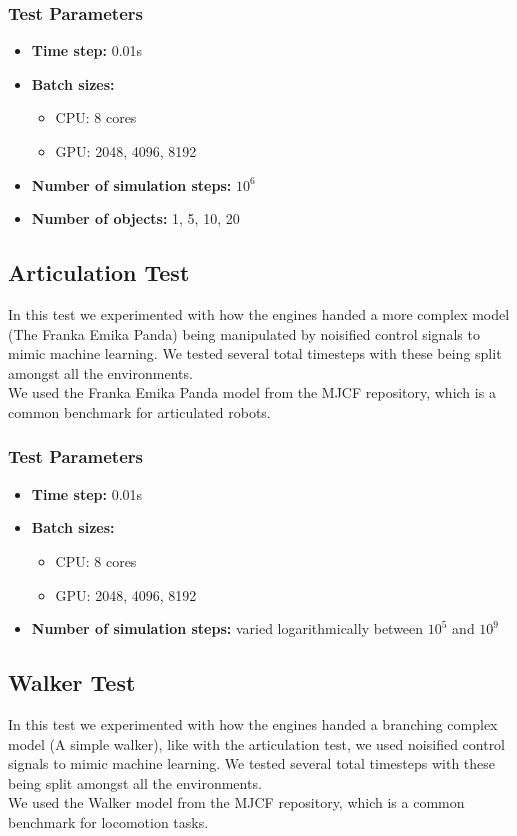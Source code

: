 \documentclass[11pt,a4paper]{article}
\begin{document}
\subsubsection{Test Parameters}
\begin{itemize}
    \item \textbf{Time step:} 0.01s
    \item \textbf{Batch sizes:} 
    \begin{itemize}
        \item CPU: 8 cores 
        \item GPU: 2048, 4096, 8192
    \end{itemize}
    \item \textbf{Number of simulation steps:} $10^6$
    \item \textbf{Number of objects:} 1, 5, 10, 20
\end{itemize}

\subsection{Articulation Test}
In this test we experimented with how the engines handed a more complex model (The Franka Emika Panda) being manipulated by noisified control signals to mimic machine learning. We tested several total timesteps with these being split amongst all the environments. \\
We used the Franka Emika Panda model from the MJCF repository, which is a common benchmark for articulated robots.

\subsubsection{Test Parameters}
\begin{itemize}
    \item \textbf{Time step:} 0.01s
    \item \textbf{Batch sizes:} 
    \begin{itemize}
        \item CPU: 8 cores 
        \item GPU: 2048, 4096, 8192
    \end{itemize}
    \item \textbf{Number of simulation steps:} varied logarithmically between $10^5$ and $10^9$
\end{itemize}

\subsection{Walker Test}
In this test we experimented with how the engines handed a branching complex model (A simple walker), like with the articulation test, we used noisified control signals to mimic machine learning. We tested several total timesteps with these being split amongst all the environments. \\
We used the Walker model from the MJCF repository, which is a common benchmark for locomotion tasks.
\end{document}
